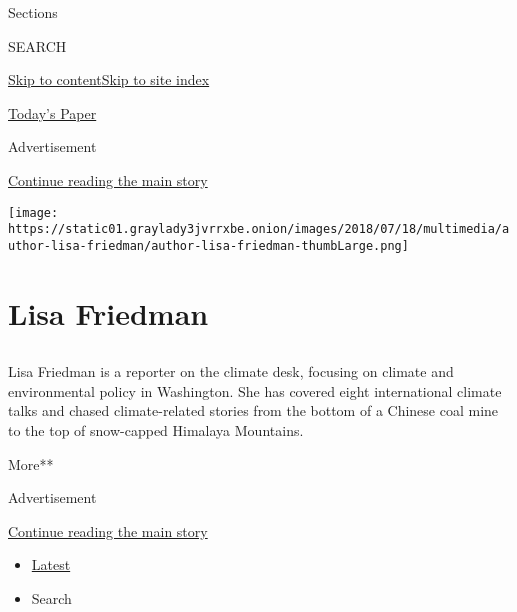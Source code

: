 Sections

SEARCH

\protect\hyperlink{site-content}{Skip to
content}\protect\hyperlink{site-index}{Skip to site index}

\href{https://myaccount.nytimes3xbfgragh.onion/auth/login?response_type=cookie\&client_id=vi}{}

\href{https://www.nytimes3xbfgragh.onion/section/todayspaper}{Today's
Paper}

Advertisement

\protect\hyperlink{after-top}{Continue reading the main story}

\texttt{[image: https://static01.graylady3jvrrxbe.onion/images/2018/07/18/multimedia/author-lisa-friedman/author-lisa-friedman-thumbLarge.png]}

\hypertarget{lisa-friedman}{%
\section{Lisa Friedman}\label{lisa-friedman}}

\subsection{}

Lisa Friedman is a reporter on the climate desk, focusing on climate and
environmental policy in Washington. She has covered eight international
climate talks and chased climate-related stories from the bottom of a
Chinese coal mine to the top of snow-capped Himalaya Mountains.

More**

Advertisement

\protect\hyperlink{after-mid1}{Continue reading the main story}

\begin{itemize}
\tightlist
\item
  \protect\hyperlink{stream-panel}{Latest}
\item
  Search
\end{itemize}

